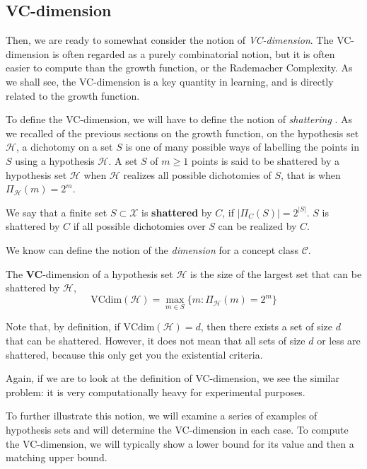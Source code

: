 \subsection{VC-dimension}
Then, we are ready to somewhat consider the notion of \textit{VC-dimension}. The VC-dimension is often regarded as a purely combinatorial notion, but it is often easier to compute than the growth function, or the Rademacher Complexity. As we shall see, the VC-dimension is a key quantity in learning, and is directly related to the growth function. 

To define the VC-dimension, we will have to define the notion of \textit{shattering} . As we recalled of the previous sections on the growth function, on the hypothesis set $\mathcal{H}$, a dichotomy on a set $S$ is one of many possible ways of labelling the points in $S$ using a hypothesis $\mathcal{H}$. A set $S$ of $m\geq 1$ points is said to be shattered by a hypothesis set $\mathcal{H}$ when $\mathcal{H}$ realizes all possible dichotomies of $S$, that is when $\Pi_{\mathcal{H}}(m)=2^{m}$. 
\begin{definition}[Shattering]
    We say that a finite set $S\subset \mathcal{X}$ is \textbf{shattered} by $C$, if $|\Pi_{C}(S)|=2^{|S|}$. $S$ is shattered by $C$ if all possible dichotomies over $S$ can be realized by $C$. 
\end{definition}

We know can define the notion of the \textit{dimension} for a concept class $\mathcal{C}$. 
\begin{definition}[VC-dimension]
    The \textbf{VC}-dimension of a hypothesis set $\mathcal{H}$ is the size of the largest set that can be shattered by $\mathcal{H}$, 
    \begin{equation}
        \mathrm{VCdim}(\mathcal{H}) = \max_{m\in S} \{m: \Pi_{\mathcal{H}}(m)=2^{m}\}
    \end{equation}
\end{definition}
Note that, by definition, if $\mathrm{VCdim}(\mathcal{H}) =d$, then there exists a set of size $d$ that can be shattered. However, it does not mean that all sets of size $d$ or less are shattered, because this only get you the existential criteria. 

Again, if we are to look at the definition of VC-dimension, we see the similar problem: it is very computationally heavy for experimental purposes. 

To further illustrate this notion, we will examine a series of examples of hypothesis sets and will determine the VC-dimension in each case. To compute the VC-dimension, we will typically show a lower bound for its value and then a matching upper bound. 

